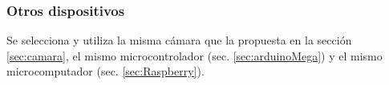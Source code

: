 \subsubsection{Otros dispositivos}
Se selecciona y utiliza la misma cámara que la propuesta en la sección \ref{sec:camara}, el mismo microcontrolador (sec. \ref{sec:arduinoMega}) y el mismo microcomputador (sec. \ref{sec:Raspberry}).